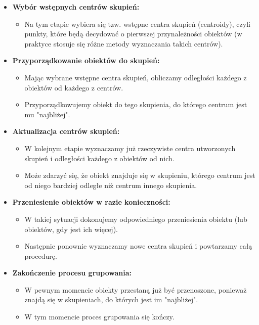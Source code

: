 \documentclass{article}
\begin{document}
\begin{itemize}
    \item \textbf{Wybór wstępnych centrów skupień:}
    \begin{itemize}
        \item Na tym etapie wybiera się tzw. wstępne centra skupień (centroidy), czyli punkty, które będą decydować o pierwszej przynależności obiektów (w praktyce stosuje się różne metody wyznaczania takich centrów).
    \end{itemize}
    
    \item \textbf{Przyporządkowanie obiektów do skupień:}
    \begin{itemize}
        \item Mając wybrane wstępne centra skupień, obliczamy odległości każdego z obiektów od każdego z centrów.
        \item Przyporządkowujemy obiekt do tego skupienia, do którego centrum jest mu "najbliżej".
    \end{itemize}
    
    \item \textbf{Aktualizacja centrów skupień:}
    \begin{itemize}
        \item W kolejnym etapie wyznaczamy już rzeczywiste centra utworzonych skupień i odległości każdego z obiektów od nich.
        \item Może zdarzyć się, że obiekt znajduje się w skupieniu, którego centrum jest od niego bardziej odległe niż centrum innego skupienia.
    \end{itemize}
    
    \item \textbf{Przeniesienie obiektów w razie konieczności:}
    \begin{itemize}
        \item W takiej sytuacji dokonujemy odpowiedniego przeniesienia obiektu (lub obiektów, gdy jest ich więcej).
        \item Następnie ponownie wyznaczamy nowe centra skupień i powtarzamy całą procedurę.
    \end{itemize}
    
    \item \textbf{Zakończenie procesu grupowania:}
    \begin{itemize}
        \item W pewnym momencie obiekty przestaną już być przenoszone, ponieważ znajdą się w skupieniach, do których jest im "najbliżej".
        \item W tym momencie proces grupowania się kończy.
    \end{itemize}
\end{itemize}
\end{document}
